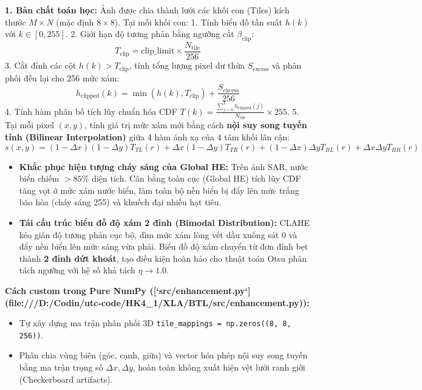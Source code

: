 \documentclass[11pt,a4paper]{article}
\begin{document}
\textbf{1. Bản chất toán học:}
Ảnh được chia thành lưới các khối con (Tiles) kích thước $M \times N$ (mặc định $8 \times 8$). Tại mỗi khối con:
1. Tính biểu đồ tần suất $h(k)$ với $k \in [0, 255]$.
2. Giới hạn độ tương phản bằng ngưỡng cắt $\beta_{\text{clip}}$:
\begin{equation}
T_{\text{clip}} = \text{clip\_limit} \times \frac{N_{\text{tile}}}{256}
\end{equation}
3. Cắt đỉnh các cột $h(k) > T_{\text{clip}}$, tính tổng lượng pixel dư thừa $S_{\text{excess}}$ và phân phối đều lại cho 256 mức xám:
\begin{equation}
h_{\text{clipped}}(k) = \min(h(k), T_{\text{clip}}) + \frac{S_{\text{excess}}}{256}
\end{equation}
4. Tính hàm phân bố tích lũy chuẩn hóa CDF $T(k) = \frac{\sum_{j=0}^k h_{\text{clipped}}(j)}{N_{\text{tile}}} \times 255$.
5. Tại mỗi pixel $(x, y)$, tính giá trị mức xám mới bằng cách \textbf{nội suy song tuyến tính (Bilinear Interpolation)} giữa 4 hàm ánh xạ của 4 tâm khối lân cận:
\begin{equation}
s(x, y) = (1 - \Delta x)(1 - \Delta y) T_{TL}(r) + \Delta x (1 - \Delta y) T_{TR}(r) + (1 - \Delta x) \Delta y T_{BL}(r) + \Delta x \Delta y T_{BR}(r)
\end{equation}

\begin{whyuse}
\begin{itemize}
    \item \textbf{Khắc phục hiện tượng cháy sáng của Global HE:} Trên ảnh SAR, nước biển chiếm $> 85\%$ diện tích. Cân bằng toàn cục (Global HE) tích lũy CDF tăng vọt ở mức xám nước biển, làm toàn bộ nền biển bị đẩy lên mức trắng bão hòa (cháy sáng 255) và khuếch đại nhiễu hạt tiêu.
    \item \textbf{Tái cấu trúc biểu đồ độ xám 2 đỉnh (Bimodal Distribution):} CLAHE kéo giãn độ tương phản cục bộ, dìm mức xám lòng vết dầu xuống sát 0 và đẩy nền biển lên mức sáng vừa phải. Biểu đồ độ xám chuyển từ đơn đỉnh bẹt thành \textbf{2 đỉnh dứt khoát}, tạo điều kiện hoàn hảo cho thuật toán Otsu phân tách ngưỡng với hệ số khả tách $\eta \to 1.0$.
\end{itemize}
\end{whyuse}

\begin{custombox}
\textbf{Cách custom trong Pure NumPy ([`src/enhancement.py`](file:///D:/Codin/utc-code/HK4_1/XLA/BTL/src/enhancement.py)):}
\begin{itemize}
    \item Tự xây dựng ma trận phân phối 3D \lstinline|tile_mappings = np.zeros((8, 8, 256))|.
    \item Phân chia vùng biên (góc, cạnh, giữa) và vector hóa phép nội suy song tuyến bằng ma trận trọng số $\Delta x, \Delta y$, hoàn toàn không xuất hiện vệt lưới ranh giới (Checkerboard artifacts).
\end{itemize}
\end{custombox}
\end{document}
